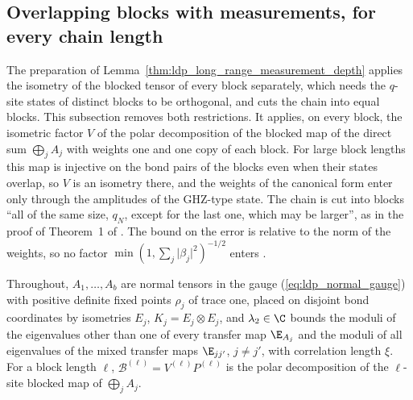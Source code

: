 
\subsection{Overlapping blocks with measurements, for every chain length}
\label{sec:ldp_overlapping_measurements}

The preparation of Lemma~\ref{thm:ldp_long_range_measurement_depth} applies
the isometry of the blocked tensor of every block separately, which needs the
$q$-site states of distinct blocks to be orthogonal, and cuts the chain into
equal blocks. This subsection removes both restrictions. It applies, on every
block, the isometric factor $V$ of the polar decomposition of the blocked map of
the direct sum $\bigoplus_jA_j$ with weights one and one copy of each block. For
large block lengths this map is injective on the bond pairs of the blocks even
when their states overlap, so $V$ is an isometry there, and the weights of the
canonical form enter only through the amplitudes of the GHZ-type state. The
chain is cut into blocks ``all of the same size, $q_N$, except for the last one,
which may be larger'', as in the proof of Theorem~1 of
\cite{Malz2024Preparation}. The bound on the error is relative to the norm of
the weights, so no factor $\min(1,\sum_j\lvert\beta_j\rvert^2)^{-1/2}$ enters
\cite{gap:mswc24_measurement_preparation_scope}.

Throughout, $A_1,\dots,A_b$ are normal tensors in the gauge
(\ref{eq:ldp_normal_gauge}) with positive definite fixed points $\rho_j$ of trace
one, placed on disjoint bond coordinates by isometries $E_j$, $K_j=E_j\otimes
    E_j$, and $\lambda_2\in\C$ bounds the moduli of the eigenvalues other than one of
every transfer map $\E_{A_j}$ and the moduli of all eigenvalues of the mixed
transfer maps $\E_{jj'}$, $j\neq j'$, with correlation length $\xi$. For a block
length $\ell$, $\mathcal B^{(\ell)}=V^{(\ell)}P^{(\ell)}$ is the polar
decomposition of the $\ell$-site blocked map of $\bigoplus_jA_j$.

